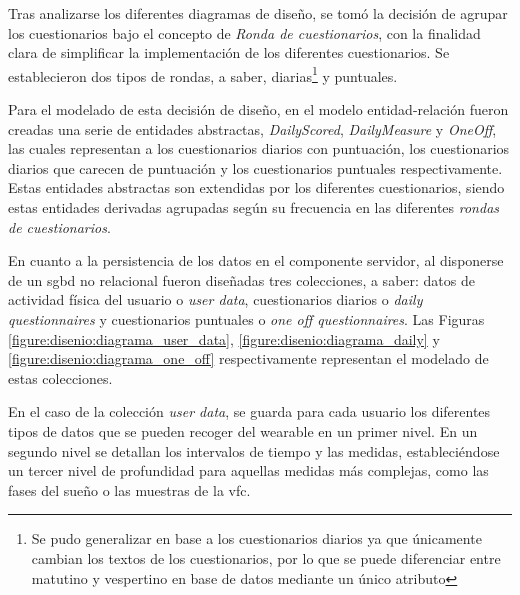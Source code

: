             \clearpage  %


            Tras analizarse los diferentes diagramas de diseño, se tomó la decisión de agrupar los cuestionarios bajo el concepto de \textit{Ronda de cuestionarios}, con la finalidad clara de simplificar la implementación de los diferentes cuestionarios. Se establecieron dos tipos de rondas, a saber, diarias\footnote{Se pudo generalizar en base a los cuestionarios diarios ya que únicamente cambian los textos de los cuestionarios, por lo que se puede diferenciar entre matutino y vespertino en base de datos mediante un único atributo} y puntuales.

            Para el modelado de esta decisión de diseño, en el modelo entidad-relación fueron creadas una serie de entidades abstractas, \textit{DailyScored}, \textit{DailyMeasure} y \textit{OneOff}, las cuales representan a los cuestionarios diarios con puntuación, los cuestionarios diarios que carecen de puntuación y los cuestionarios puntuales respectivamente. Estas entidades abstractas son extendidas por los diferentes cuestionarios, siendo estas entidades derivadas agrupadas según su frecuencia en las diferentes \textit{rondas de cuestionarios}. 

            En cuanto a la persistencia de los datos en el componente servidor, al disponerse de un \gls{sgbd} no relacional fueron diseñadas tres colecciones, a saber: datos de actividad física del usuario o \textit{user data}, cuestionarios diarios o \textit{daily questionnaires} y cuestionarios puntuales o \textit{one off questionnaires}. Las Figuras \ref{figure:disenio:diagrama_user_data},  \ref{figure:disenio:diagrama_daily} y \ref{figure:disenio:diagrama_one_off} respectivamente representan el modelado de estas colecciones.

            En el caso de la colección \textit{user data}, se guarda para cada usuario los diferentes tipos de datos que se pueden recoger del \gls{wearable} en un primer nivel. En un segundo nivel se detallan los intervalos de tiempo y las medidas, estableciéndose un tercer nivel de profundidad para aquellas medidas más complejas, como las fases del sueño o las muestras de la \gls{vfc}.

